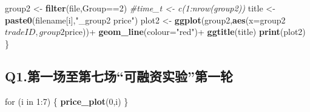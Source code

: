 \documentclass[]{article}
\newenvironment{Shaded}{\begin{snugshade}}{\end{snugshade}}
\newcommand{\KeywordTok}[1]{\textcolor[rgb]{0.13,0.29,0.53}{\textbf{{#1}}}}
\newcommand{\DataTypeTok}[1]{\textcolor[rgb]{0.13,0.29,0.53}{{#1}}}
\newcommand{\DecValTok}[1]{\textcolor[rgb]{0.00,0.00,0.81}{{#1}}}
\newcommand{\StringTok}[1]{\textcolor[rgb]{0.31,0.60,0.02}{{#1}}}
\newcommand{\CommentTok}[1]{\textcolor[rgb]{0.56,0.35,0.01}{\textit{{#1}}}}
\newcommand{\NormalTok}[1]{{#1}}
\begin{document}
\begin{Shaded}
\begin{Highlighting}[]
  \NormalTok{group2 <-}\StringTok{ }\KeywordTok{filter}\NormalTok{(file,Group==}\DecValTok{2}\NormalTok{)}
  \CommentTok{#time_t <- c(1:nrow(group2))}
  \NormalTok{title <-}\StringTok{ }\KeywordTok{paste0}\NormalTok{(filename[i],}\StringTok{"_group2 price"}\NormalTok{)}
  \NormalTok{plot2 <-}\StringTok{ }\KeywordTok{ggplot}\NormalTok{(group2,}\KeywordTok{aes}\NormalTok{(}\DataTypeTok{x=}\NormalTok{group2$tradeID,group2$price))+}
\StringTok{    }\KeywordTok{geom_line}\NormalTok{(}\DataTypeTok{colour=}\StringTok{"red"}\NormalTok{)+}
\StringTok{    }\KeywordTok{ggtitle}\NormalTok{(title)}
  \KeywordTok{print}\NormalTok{(plot2)}
\NormalTok{\}}
\end{Highlighting}
\end{Shaded}

\subsection{\texorpdfstring{Q1.第一场至第七场``可融资实验''第一轮}{Q1.第一场至第七场可融资实验第一轮}}\label{q1.}

\begin{Shaded}
\begin{Highlighting}[]
\NormalTok{for (i in }\DecValTok{1}\NormalTok{:}\DecValTok{7}\NormalTok{) }
\NormalTok{\{}
  \KeywordTok{price_plot}\NormalTok{(}\DecValTok{0}\NormalTok{,i)}
\NormalTok{\}}
\end{Highlighting}
\end{Shaded}
\end{document}
